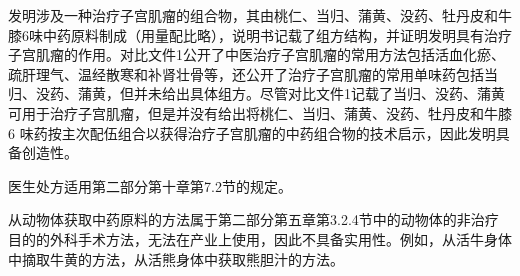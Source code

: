 {\par}

发明涉及一种治疗子宫肌瘤的组合物，其由桃仁、当归、蒲黄、没药、牡丹皮和牛膝6味中药原料制成（用量配比略），说明书记载了组方结构，并证明发明具有治疗子宫肌瘤的作用。对比文件1公开了中医治疗子宫肌瘤的常用方法包括活血化瘀、疏肝理气、温经散寒和补肾壮骨等，还公开了治疗子宫肌瘤的常用单味药包括当归、没药、蒲黄，但并未给出具体组方。尽管对比文件1记载了当归、没药、蒲黄可用于治疗子宫肌瘤，但是并没有给出将桃仁、当归、蒲黄、没药、牡丹皮和牛膝6 味药按主次配伍组合以获得治疗子宫肌瘤的中药组合物的技术启示，因此发明具备创造性。

医生处方适用第二部分第十章第7.2节的规定。

从动物体获取中药原料的方法属于第二部分第五章第3.2.4节中的动物体的非治疗目的的外科手术方法，无法在产业上使用，因此不具备实用性。例如，从活牛身体中摘取牛黄的方法，从活熊身体中获取熊胆汁的方法。

\stopparttoc
